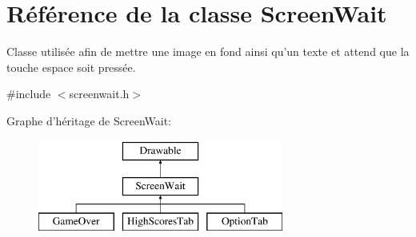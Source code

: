 \hypertarget{class_screen_wait}{\section{Référence de la classe Screen\+Wait}
\label{class_screen_wait}
}


Classe utilisée afin de mettre une image en fond ainsi qu'un texte et attend que la touche espace soit pressée.  




{\ttfamily \#include $<$screenwait.\+h$>$}

Graphe d'héritage de Screen\+Wait\+:\begin{figure}[H]
\begin{center}
\leavevmode
\includegraphics[height=3.000000cm]{class_screen_wait}
\end{center}
\end{figure}
